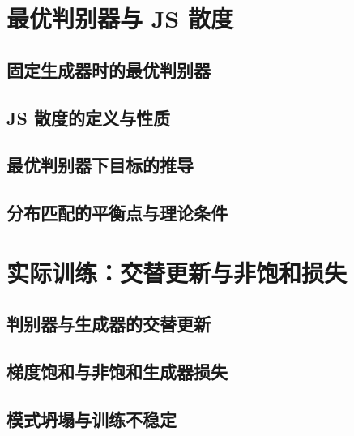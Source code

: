 \section{最优判别器与 JS 散度}
\label{sec:gan-js}
\contentplaceholder

\subsection{固定生成器时的最优判别器}
\label{subsec:gan-optimal-discriminator}
\contentplaceholder

\subsection{JS 散度的定义与性质}
\label{subsec:gan-js-definition}
\contentplaceholder

\subsection{最优判别器下目标的推导}
\label{subsec:gan-derivation}
\contentplaceholder

\subsection{分布匹配的平衡点与理论条件}
\label{subsec:gan-equilibrium}
\contentplaceholder

\section{实际训练：交替更新与非饱和损失}
\label{sec:gan-training}
\contentplaceholder

\subsection{判别器与生成器的交替更新}
\label{subsec:gan-alternating}
\contentplaceholder

\subsection{梯度饱和与非饱和生成器损失}
\label{subsec:gan-non-saturating}
\contentplaceholder

\subsection{模式坍塌与训练不稳定}
\label{subsec:gan-collapse}
\contentplaceholder

